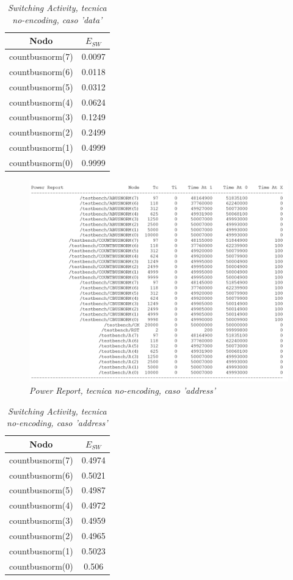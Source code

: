 \begin{table}[!h]\footnotesize
	\centering
	\begin{tabular}{|c|c|}
		\hline
		\textbf{Nodo} & \textbf{$E_{SW}$}\\
		\hline
		countbusnorm(7) & 0.0097\\
		countbusnorm(6) & 0.0118\\
		countbusnorm(5) & 0.0312\\
		countbusnorm(4) & 0.0624\\
		countbusnorm(3) & 0.1249\\
		countbusnorm(2) & 0.2499\\
		countbusnorm(1) & 0.4999\\
		countbusnorm(0) & 0.9999\\
		\hline
	\end{tabular}
	\caption{\textit{Switching Activity, tecnica no-encoding, caso 'data'}}
	\label{Tab1}
\end{table}
\newpage
\begin{figure}[!htb]
	\centering
	\includegraphics[scale=0.8]{immagini/4_1_addres_report}
	\caption{\textit{Power Report, tecnica no-encoding, caso 'address'}}
	\label{report_address_41}
\end{figure}
\begin{table}[!h]\footnotesize
	\centering
	\begin{tabular}{|c|c|}
		\hline
		\textbf{Nodo} & \textbf{$E_{SW}$}\\
		\hline
		countbusnorm(7) & 0.4974\\
		countbusnorm(6) & 0.5021\\
		countbusnorm(5) & 0.4987\\
		countbusnorm(4) & 0.4972\\
		countbusnorm(3) & 0.4959\\
		countbusnorm(2) & 0.4965\\
		countbusnorm(1) & 0.5023\\
		countbusnorm(0) & 0.506\\
		\hline
	\end{tabular}
	\caption{\textit{Switching Activity, tecnica no-encoding, caso 'address'}}
	\label{Tab2}
\end{table}
